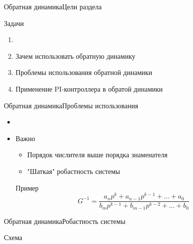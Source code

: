 \begin{frame}{Обратная динамика}{Цели раздела}
    \begin{block}{Задачи}
        \begin{enumerate}
            \item <+-> []
            \item <+-> Зачем использовать обратную динамику 
            \item <+-> Проблемы использования обратной динамики
            \item <+-> Применение PI-контроллера в обратой динамики
        \end{enumerate}
    \end{block}
\end{frame}


\begin{frame}{Обратная динамика}{Проблемы использования}
    \begin{itemize}
        \item <+-> []
        \item <+-> [] \begin{block}{Важно}
            \begin{itemize}
                \item Порядок числителя выше порядка знаменателя 
                \item "Шаткая" робастность системы
            \end{itemize}
        \end{block}
        \begin{exampleblock}{Пример}
            $$G^{-1} = \frac{a_n p^k + a_{n-1} p^{k-1} + ... + a_0}{b_m p^{k-1} + b_{m-1} p^{k-2} + ... + b_0}$$
        \end{exampleblock}
    \end{itemize}
\end{frame}

\begin{frame}{Обратная динамика}{Робастность системы}
    \begin{block}{Схема}
    \end{block}
\end{frame}

